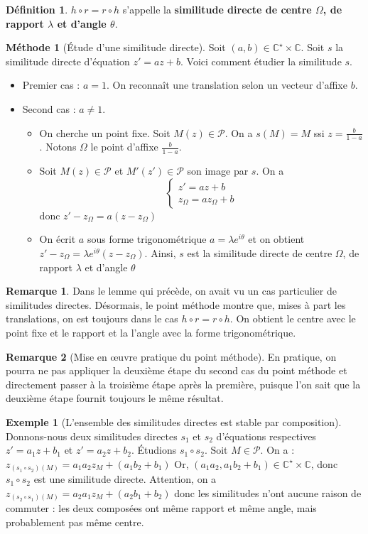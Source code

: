 \documentclass[french]{book}
\newcommand{\C}{\mathbb{C}}
\newcommand{\st}{^\star}
\theoremstyle{plain}
\theoremstyle{definition}
\newtheorem{dfn}{Définition}[chapter]
\newtheorem{exa}{Exemple}[chapter]
\newtheorem{rmq}{Remarque}[chapter]
\newtheorem{met}{Méthode}[chapter]
\theoremstyle{remark}
\begin{document}
\begin{dfn}
	$h\circ r=r\circ h$ s'appelle la \textbf{similitude directe de centre $\Omega$, de rapport $\lambda$ et d'angle $\theta$}.
\end{dfn}
\begin{met}[Étude d'une similitude directe]
	Soit $(a,b)\in\C\st\times\C$. Soit $s$ la similitude directe d'équation $z'=az+b$. Voici comment étudier la similitude $s$.
	\begin{itemize}
		\item Premier cas : $a=1$. On reconnaît une translation selon un vecteur d'affixe $b$.
		\item Second cas : $a\ne1$. 
		\begin{itemize}
			\item[--] On cherche un point fixe. Soit $M(z)\in\mathcal{P}$. On a $s(M)=M$ ssi $\displaystyle z=\frac{b}{1-a}$. Notons $\Omega$ le point d'affixe $\displaystyle \frac{b}{1-a}$.
			\item[--] Soit $M(z)\in\mathcal{P}$ et $M'(z')\in\mathcal{P}$ son image par $s$. On a $$\begin{cases}
				z'=az+b \\ z_{\Omega}=az_{\Omega}+b
			\end{cases}$$ donc $z'-z_{\Omega}=a(z-z_{\Omega})$
			\item[--] On écrit $a$ sous forme trigonométrique $a=\lambda e^{i\theta}$ et on obtient $z'-z_{\Omega}=\lambda e^{i\theta}(z-z_{\Omega})$. Ainsi, $s$ est la similitude directe de centre $\Omega$, de rapport $\lambda$ et d'angle $\theta$
		\end{itemize}
	\end{itemize}
\end{met}
\begin{rmq}
	Dans le lemme qui précède, on avait vu un cas particulier de similitudes directes. Désormais, le point méthode montre que, mises à part les translations, on est toujours dans le cas $h\circ r=r\circ h$. On obtient le centre avec le point fixe et le rapport et la l'angle avec la forme trigonométrique.
\end{rmq}
\begin{rmq}[Mise en œuvre pratique du point méthode]
	En pratique, on pourra ne pas appliquer la deuxième étape du second cas du point méthode et directement passer à la troisième étape après la première, puisque l'on sait que la deuxième étape fournit toujours le même résultat.
\end{rmq}
\begin{exa}[L'ensemble des similitudes directes est stable par composition]
	Donnons-nous deux similitudes directes $s_1$ et $s_2$ d'équations respectives $z'=a_1z+b_1$ et $z'=a_2z+b_2$. Étudions $s_1\circ s_2$. Soit $M\in\mathcal{P}$. On a : $z_{(s_1\circ s_2)(M)}=a_1a_2z_M+(a_1b_2+b_1)$ Or, $(a_1a_2,a_1b_2+b_1)\in\C\st\times\C$, donc $s_1\circ s_2$ est une similitude directe. Attention, on a $z_{(s_2\circ s_1)(M)}=a_2a_1z_M+(a_2b_1+b_2)$ donc les similitudes n'ont aucune raison de commuter : les deux composées ont même rapport et même angle, mais probablement pas même centre. 
\end{exa}
\end{document}
